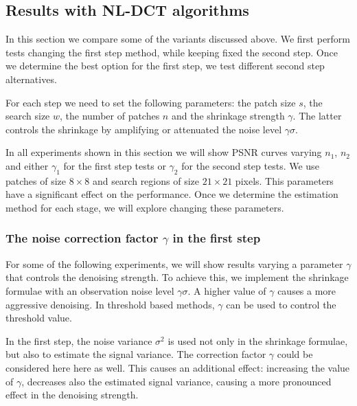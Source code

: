 \documentclass{ipol}
\begin{document}
\subsection{Results with NL-DCT algorithms}

In this section we compare some of the variants discussed above. We first 
perform tests changing the first step method, while keeping fixed the second
step. Once we determine the best option for the first step, we test different 
second step alternatives.

For each step we need to set the following parameters: the patch size $s$, the
search size $w$, the number of patches $n$ and the shrinkage 
strength $\gamma$. The latter controls the shrinkage by amplifying or
attenuated the noise level $\gamma\sigma$.

In all experiments shown in this section we will show PSNR curves varying $n_1$,
$n_2$ and either $\gamma_1$ for the first step tests or $\gamma_2$ for the
second step tests. 
We use patches of size $8\times 8$ and
search regions of size $21\times 21$ pixels. This parameters have a significant
effect on the performance. Once we determine the estimation method for each stage, 
we will explore changing these parameters.

\subsubsection{The noise correction factor $\gamma$ in the first step}

For some of the following experiments, we will show results varying a parameter
$\gamma$ that controls the denoising strength. To achieve this, we implement
the shrinkage formulae with an observation noise level $\gamma\sigma$. A higher value
of $\gamma$ causes a more aggressive denoising. In threshold based methods, $\gamma$ 
can be used to control the threshold value.

In the first step, the noise variance $\sigma^2$ is used not only in the shrinkage 
formulae, but also to estimate the signal variance. The correction factor $\gamma$ could be
considered here here as well. This causes an additional effect: increasing the
value of $\gamma$, decreases also the estimated signal variance, causing a more
pronounced effect in the denoising strength.
\end{document}
